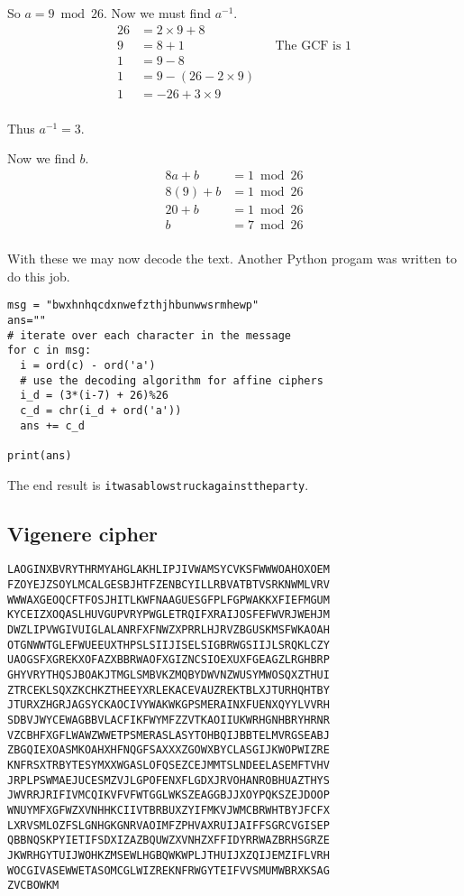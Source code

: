 \documentclass{article}
\begin{document}
So $a = 9 \bmod 26$. Now we must find $a^{-1}$.
\begin{align*}
    26 &= 2\times9 + 8 \\
    9 &= 8 + 1 && \text{The GCF is 1} \\
    1 &= 9 - 8 \\
    1 &= 9 - (26 - 2\times9) \\
    1 &= -26 + 3\times9 \\
\end{align*}

Thus $a^{-1} = 3$.

Now we find $b$.
\begin{align*}
    8a + b &= 1 \bmod 26 \\
    8(9) + b &= 1 \bmod 26 \\
    20 + b &= 1 \bmod 26 \\
    b &= 7 \bmod 26 \\
\end{align*}

With these we may now decode the text. Another Python progam was written to do
this job.
\begin{verbatim}
msg = "bwxhnhqcdxnwefzthjhbunwwsrmhewp"
ans=""
# iterate over each character in the message
for c in msg:
  i = ord(c) - ord('a')
  # use the decoding algorithm for affine ciphers
  i_d = (3*(i-7) + 26)%26
  c_d = chr(i_d + ord('a'))
  ans += c_d

print(ans)
\end{verbatim}

The end result is \texttt{itwasablowstruckagainsttheparty}.

\subsection{Vigenere cipher}
\begin{verbatim}
LAOGINXBVRYTHRMYAHGLAKHLIPJIVWAMSYCVKSFWWWOAHOXOEM
FZOYEJZSOYLMCALGESBJHTFZENBCYILLRBVATBTVSRKNWMLVRV
WWWAXGEOQCFTFOSJHITLKWFNAAGUESGFPLFGPWAKKXFIEFMGUM
KYCEIZXOQASLHUVGUPVRYPWGLETRQIFXRAIJOSFEFWVRJWEHJM
DWZLIPVWGIVUIGLALANRFXFNWZXPRRLHJRVZBGUSKMSFWKAOAH
OTGNWWTGLEFWUEEUXTHPSLSIIJISELSIGBRWGSIIJLSRQKLCZY
UAOGSFXGREKXOFAZXBBRWAOFXGIZNCSIOEXUXFGEAGZLRGHBRP
GHYVRYTHQSJBOAKJTMGLSMBVKZMQBYDWVNZWUSYMWOSQXZTHUI
ZTRCEKLSQXZKCHKZTHEEYXRLEKACEVAUZREKTBLXJTURHQHTBY
JTURXZHGRJAGSYCKAOCIVYWAKWKGPSMERAINXFUENXQYYLVVRH
SDBVJWYCEWAGBBVLACFIKFWYMFZZVTKAOIIUKWRHGNHBRYHRNR
VZCBHFXGFLWAWZWWETPSMERASLASYTOHBQIJBBTELMVRGSEABJ
ZBGQIEXOASMKOAHXHFNQGFSAXXXZGOWXBYCLASGIJKWOPWIZRE
KNFRSXTRBYTESYMXXWGASLOFQSEZCEJMMTSLNDEELASEMFTVHV
JRPLPSWMAEJUCESMZVJLGPOFENXFLGDXJRVOHANROBHUAZTHYS
JWVRRJRIFIVMCQIKVFVFWTGGLWKSZEAGGBJJXOYPQKSZEJDOOP
WNUYMFXGFWZXVNHHKCIIVTBRBUXZYIFMKVJWMCBRWHTBYJFCFX
LXRVSMLOZFSLGNHGKGNRVAOIMFZPHVAXRUIJAIFFSGRCVGISEP
QBBNQSKPYIETIFSDXIZAZBQUWZXVNHZXFFIDYRRWAZBRHSGRZE
JKWRHGYTUIJWOHKZMSEWLHGBQWKWPLJTHUIJXZQIJEMZIFLVRH
WOCGIVASEWWETASOMCGLWIZREKNFRWGYTEIFVVSMUMWBRXKSAG
ZVCBOWKM
\end{verbatim}
\end{document}

